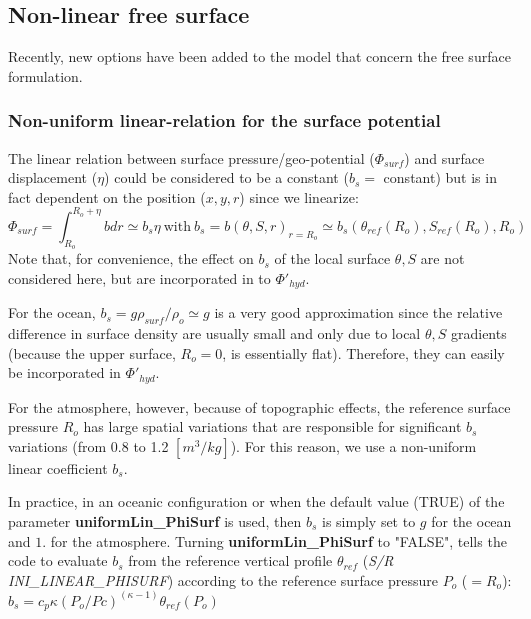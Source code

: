 


\subsection{Non-linear free surface}
\label{sect:nonlinear-freesurface}

Recently, new options have been added to the model
that concern the free surface formulation.


\subsubsection{Non-uniform linear-relation for the surface potential}

The linear relation between surface pressure/geo-potential
($\Phi_{surf}$) and surface displacement ($\eta$) could be considered
to be a constant ($b_s=$ constant)
but is in fact dependent on the position ($x,y,r$)
since we linearize:
$$\Phi_{surf}=\int_{R_o}^{R_o+\eta} b dr \simeq b_s \eta
~\mathrm{with}~ b_s = b(\theta,S,r)_{r=R_o} 
\simeq b_s(\theta_{ref}(R_o),S_{ref}(R_o),R_o)$$
Note that, for convenience, the effect on $b_s$ of the local surface
$\theta,S$ are not considered here, but are incorporated in to
$\Phi'_{hyd}$.

For the ocean, $b_s = g \rho_{surf} / \rho_o \simeq g$ is a very good
approximation since the relative difference in surface density are
usually small and only due to local $\theta,S$ gradients (because the
upper surface, $R_o = 0$, is essentially flat). Therefore, they can
easily be incorporated in $\Phi'_{hyd}$.

For the atmosphere, however, because of topographic effects, the
reference surface pressure $R_o$ has large spatial variations that
are responsible for significant $b_s$ variations (from 0.8 to 1.2
$[m^3/kg]$). For this reason, we use a non-uniform linear coefficient
$b_s$.

In practice, in an oceanic configuration or when the default value
(TRUE) of the parameter {\bf uniformLin\_PhiSurf} is used, then $b_s$
is simply set to $g$ for the ocean and $1.$ for the atmosphere.
Turning {\bf uniformLin\_PhiSurf} to "FALSE", tells the code to
evaluate $b_s$ from the reference vertical profile $\theta_{ref}$
({\it S/R INI\_LINEAR\_PHISURF}) according to the reference surface
pressure $P_o$ ($=R_o$): $b_s = c_p \kappa (P_o / Pc)^{(\kappa - 1)}
\theta_{ref}(P_o)$


